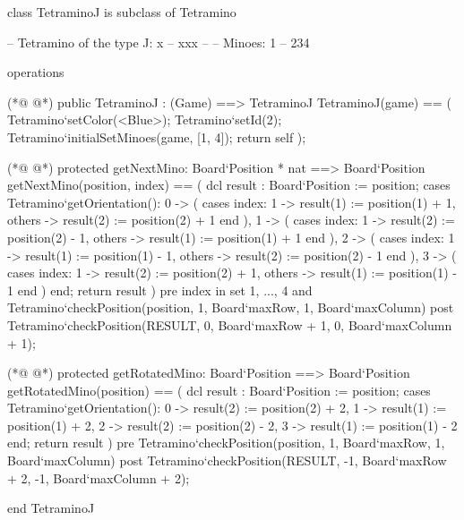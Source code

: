 \begin{vdmpp}[breaklines=true]
class TetraminoJ is subclass of Tetramino
  
 -- Tetramino of the type J: x
 --       xxx
 -- 
 -- Minoes:       1
 --        234

 
 operations
 
(*@
\label{TetraminoJ:12}
@*)
  public TetraminoJ : (Game) ==> TetraminoJ
  TetraminoJ(game) == (
   Tetramino`setColor(<Blue>);
   Tetramino`setId(2);
   Tetramino`initialSetMinoes(game, [1, 4]);
   return self
  );

(*@
\label{getNextMino:20}
@*)
  protected getNextMino: Board`Position * nat ==> Board`Position
  getNextMino(position, index) == (
   dcl result : Board`Position := position;
   cases Tetramino`getOrientation():
    0 -> (
     cases index:
      1 -> result(1) := position(1) + 1,
      others -> result(2) := position(2) + 1
     end
    ),
    1 -> (
     cases index:
      1 -> result(2) := position(2) - 1,
      others -> result(1) := position(1) + 1
     end
    ),
    2 -> (
     cases index:
      1 -> result(1) := position(1) - 1,
      others -> result(2) := position(2) - 1
     end
    ),
    3 -> (
     cases index:
      1 -> result(2) := position(2) + 1,
      others -> result(1) := position(1) - 1
     end
    )
   end;
   return result
  )
  pre index in set {1, ..., 4} 
   and Tetramino`checkPosition(position, 1, Board`maxRow, 1, Board`maxColumn)
  post Tetramino`checkPosition(RESULT, 0, Board`maxRow + 1, 0, Board`maxColumn + 1);

(*@
\label{getRotatedMino:55}
@*)
  protected getRotatedMino: Board`Position ==> Board`Position
  getRotatedMino(position) == (
   dcl result : Board`Position := position;
   cases Tetramino`getOrientation():
    0 -> result(2) := position(2) + 2,
    1 -> result(1) := position(1) + 2,
    2 -> result(2) := position(2) - 2,
    3 -> result(1) := position(1) - 2
   end;
   return result
  )
  pre Tetramino`checkPosition(position, 1, Board`maxRow, 1, Board`maxColumn)
  post Tetramino`checkPosition(RESULT, -1, Board`maxRow + 2, -1, Board`maxColumn + 2);

end TetraminoJ
\end{vdmpp}
